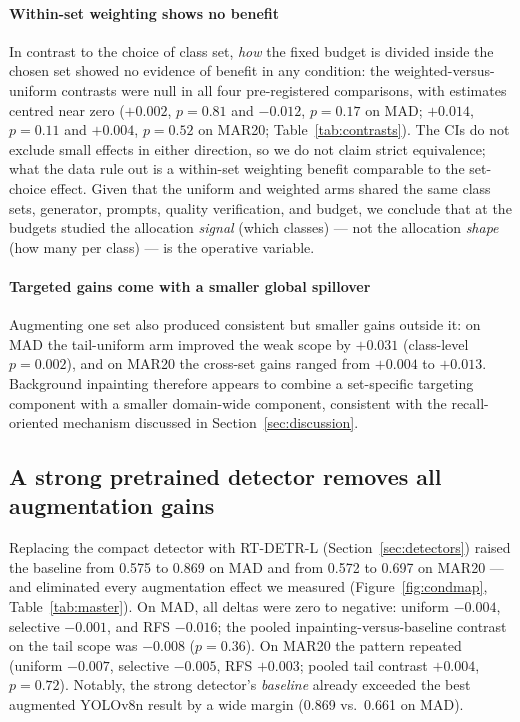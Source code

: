 \documentclass[preprint,12pt,authoryear]{elsarticle}
\begin{document}
\paragraph{Within-set weighting shows no benefit}
In contrast to the choice of class set, \emph{how} the fixed budget is
divided inside the chosen set showed no evidence of benefit in any
condition: the weighted-versus-uniform contrasts were null in all four
pre-registered comparisons, with estimates centred near zero ($+0.002$,
$p = 0.81$ and $-0.012$, $p = 0.17$ on MAD; $+0.014$, $p = 0.11$ and
$+0.004$, $p = 0.52$ on MAR20; Table~\ref{tab:contrasts}). The CIs do
not exclude small effects in either direction, so we do not claim strict
equivalence; what the data rule out is a within-set weighting benefit
comparable to the set-choice effect. Given that the uniform and weighted
arms shared the same class sets, generator, prompts, quality
verification, and budget, we conclude that at the budgets studied the
allocation \emph{signal} (which classes) --- not the allocation
\emph{shape} (how many per class) --- is the operative variable.

\paragraph{Targeted gains come with a smaller global spillover}
Augmenting one set also produced consistent but smaller gains outside
it: on MAD the tail-uniform arm improved the weak scope by $+0.031$
(class-level $p = 0.002$), and on MAR20 the cross-set gains ranged from
$+0.004$ to $+0.013$. Background inpainting therefore appears to combine
a set-specific targeting component with a smaller domain-wide component,
consistent with the recall-oriented mechanism discussed in
Section~\ref{sec:discussion}.

\subsection{A strong pretrained detector removes all augmentation gains}\label{sec:r2}

Replacing the compact detector with RT-DETR-L
(Section~\ref{sec:detectors}) raised the baseline from 0.575 to 0.869 on
MAD and from 0.572 to 0.697 on MAR20 --- and eliminated every
augmentation effect we measured (Figure~\ref{fig:condmap},
Table~\ref{tab:master}). On MAD, all deltas were zero to negative:
uniform $-0.004$, selective $-0.001$, and RFS $-0.016$; the pooled
inpainting-versus-baseline contrast on the tail scope was $-0.008$
($p = 0.36$). On MAR20 the pattern repeated (uniform $-0.007$, selective
$-0.005$, RFS $+0.003$; pooled tail contrast $+0.004$, $p = 0.72$).
Notably, the strong detector's \emph{baseline} already exceeded the best
augmented YOLOv8n result by a wide margin (0.869 vs.\ 0.661 on MAD).
\end{document}
